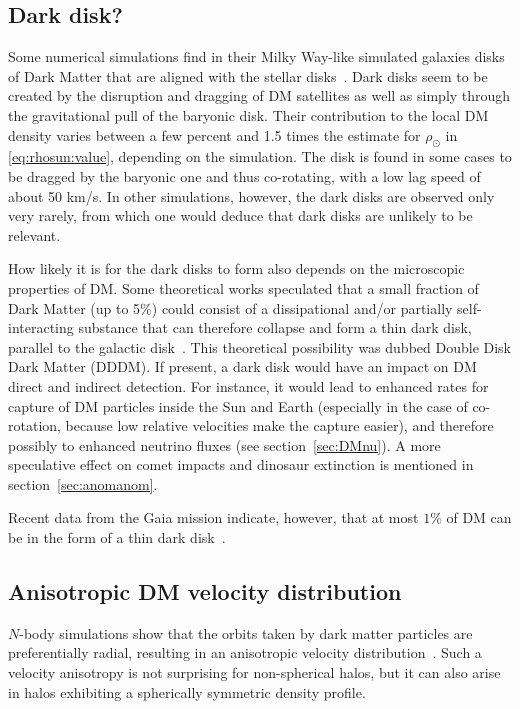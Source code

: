 \subsection{Dark disk?} \label{sec:darkdisk} 
Some numerical simulations find in their Milky Way-like simulated galaxies disks of Dark Matter that are aligned with the stellar disks~\cite{darkdisk}. Dark disks seem to be created by  the disruption and dragging of DM satellites as well as simply through the gravitational pull of the baryonic disk. Their contribution to the local DM density varies between a few percent and 1.5 times the estimate for $\rho_\odot$ in \eqref{eq:rhosun:value}, depending on the simulation. The disk is found in some cases to be dragged by the baryonic one and thus co-rotating, with a low lag speed of about 50 km/s. 
In other simulations, however, the dark disks are observed only very rarely, from which one would deduce that dark disks are unlikely to be relevant.

How likely it is for the dark disks to form also depends on the microscopic properties of DM. 
Some theoretical works speculated that a small fraction of Dark Matter (up to 5\%) could consist of a dissipational and/or partially self-interacting substance that can therefore collapse and form a thin dark disk, parallel to the galactic disk~\cite{darkdisk}. 
This theoretical possibility was dubbed Double Disk Dark Matter (DDDM).
If present, a dark disk would have an impact on DM direct and indirect detection. For instance, it would lead to enhanced rates for capture of DM particles inside the Sun and Earth (especially in the case of co-rotation, because low relative velocities make the capture easier), and therefore possibly to enhanced neutrino fluxes (see section~\ref{sec:DMnu}).
A more speculative effect on comet impacts and dinosaur extinction is mentioned in section~\ref{sec:anomanom}.

Recent data from the {\sc Gaia} mission indicate, however, that at most $1\%$ of DM can be in the form of a thin dark disk~\cite{darkdisk}. 


\subsection{Anisotropic DM velocity distribution}\label{sec:anisotropicvelocity}
 $N$-body simulations show that the orbits taken by dark matter particles are  preferentially radial, resulting in an anisotropic velocity distribution~\cite{anisotropicvelocity}. 
Such a velocity anisotropy is not surprising for non-spherical halos, but it can also arise in halos exhibiting a spherically symmetric density profile.


